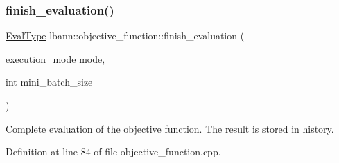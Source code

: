 \subsubsection{\texorpdfstring{finish\+\_\+evaluation()}{finish\_evaluation()}}
{\footnotesize\ttfamily \hyperlink{base_8hpp_a3266f5ac18504bbadea983c109566867}{Eval\+Type} lbann\+::objective\+\_\+function\+::finish\+\_\+evaluation (\begin{DoxyParamCaption}\item[{\hyperlink{base_8hpp_a2781a159088df64ed7d47cc91c4dc0a8}{execution\+\_\+mode}}]{mode,  }\item[{int}]{mini\+\_\+batch\+\_\+size }\end{DoxyParamCaption})}

Complete evaluation of the objective function. The result is stored in history. 

Definition at line 84 of file objective\+\_\+function.\+cpp.


